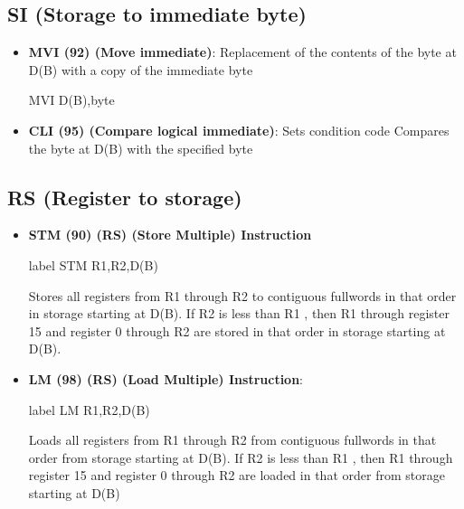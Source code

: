 \documentclass{report}
\begin{document}
    \bigbreak \noindent 
    \subsection{SI (Storage to immediate byte)}
    \begin{itemize}
        \item \textbf{MVI (92) (Move immediate)}: Replacement of the contents of the byte at D(B) with a copy of the immediate byte
            \bigbreak \noindent 
            \begin{cppcode}
            MVI   D(B),byte
            \end{cppcode}
        \item \textbf{CLI (95) (Compare logical immediate)}: Sets condition code
            \bigbreak \noindent 
            Compares the byte at D(B) with the specified byte
    \end{itemize}

    \bigbreak \noindent 
    \subsection{RS (Register to storage)}
    \begin{itemize}
        \item \textbf{STM (90) (RS) (Store Multiple) Instruction}
            \bigbreak \noindent 
            \begin{cppcode}
                label STM R1,R2,D(B)
            \end{cppcode}
            Stores all registers from R1 through R2 to contiguous fullwords in that order in storage starting at D(B).
            \bigbreak \noindent 
            If R2 is less than R1 , then R1 through register 15 and register 0 through R2 are stored in that order in storage starting at D(B).
        \item \textbf{LM (98) (RS) (Load Multiple) Instruction}:
            \bigbreak \noindent 
            \begin{cppcode}
                label LM R1,R2,D(B)
            \end{cppcode}
            \bigbreak \noindent 
            Loads all registers from R1 through R2 from contiguous fullwords in that order from storage starting at D(B).
            \bigbreak \noindent 
            If R2 is less than R1 , then R1 through register 15 and register 0 through R2 are loaded in that order from storage starting at D(B)

    \end{itemize}
\end{document}
